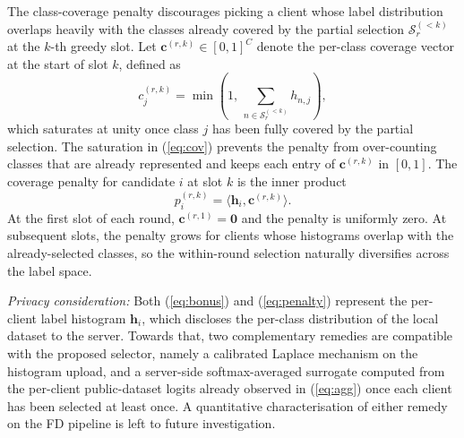 \documentclass[journal]{IEEEtran}
\newcommand{\new}[1]{#1}
\begin{document}
The class-coverage penalty discourages picking a client whose label distribution overlaps heavily with the classes already covered by the partial selection $\mathcal{S}_r^{(<k)}$ at the $k$-th greedy slot. Let $\bm{c}^{(r,k)} \in [0,1]^{C}$ denote the per-class coverage vector at the start of slot $k$, defined as
\begin{equation}
c_{j}^{(r,k)} = \min\!\left(1,\, \sum_{n \in \mathcal{S}_r^{(<k)}} h_{n,j}\right),
\label{eq:cov}
\end{equation}
which saturates at unity once class $j$ has been fully covered by the partial selection. The saturation in (\ref{eq:cov}) prevents the penalty from over-counting classes that are already represented and keeps each entry of $\bm{c}^{(r,k)}$ in $[0,1]$. The coverage penalty for candidate $i$ at slot $k$ is the inner product
\begin{equation}
p_i^{(r,k)} = \langle \bm{h}_i, \bm{c}^{(r,k)} \rangle.
\label{eq:penalty}
\end{equation}
At the first slot of each round, $\bm{c}^{(r,1)} = \bm{0}$ and the penalty is uniformly zero. At subsequent slots, the penalty grows for clients whose histograms overlap with the already-selected classes, so the within-round selection naturally diversifies across the label space.

\new{\textit{Privacy consideration:} Both (\ref{eq:bonus}) and (\ref{eq:penalty}) represent the per-client label histogram $\bm{h}_i$, which discloses the per-class distribution of the local dataset to the server. Towards that, two complementary remedies are compatible with the proposed selector, namely a calibrated Laplace mechanism on the histogram upload, and a server-side softmax-averaged surrogate computed from the per-client public-dataset logits already observed in (\ref{eq:agg}) once each client has been selected at least once. A quantitative characterisation of either remedy on the FD pipeline is left to future investigation.}
\end{document}
